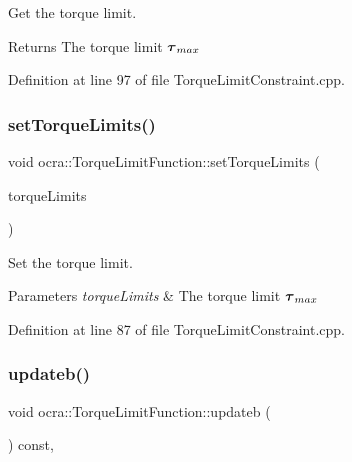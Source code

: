 Get the torque limit.

\begin{DoxyReturn}{Returns}
The torque limit $ \mbox{\boldmath${\tau}$}_{max} $ 
\end{DoxyReturn}


Definition at line 97 of file Torque\+Limit\+Constraint.\+cpp.

\hypertarget{classocra_1_1TorqueLimitFunction_a038250b745913584724401ea719177a5}{}\label{classocra_1_1TorqueLimitFunction_a038250b745913584724401ea719177a5} 
\subsubsection{\texorpdfstring{set\+Torque\+Limits()}{setTorqueLimits()}}
{\footnotesize\ttfamily void ocra\+::\+Torque\+Limit\+Function\+::set\+Torque\+Limits (\begin{DoxyParamCaption}\item[{const Eigen\+::\+Vector\+Xd \&}]{torque\+Limits }\end{DoxyParamCaption})}

Set the torque limit.


\begin{DoxyParams}{Parameters}
{\em torque\+Limits} & The torque limit $ \mbox{\boldmath${\tau}$}_{max} $ \\
\hline
\end{DoxyParams}


Definition at line 87 of file Torque\+Limit\+Constraint.\+cpp.

\hypertarget{classocra_1_1TorqueLimitFunction_a157cb13ffdc53d3a7ed568b59154b0d0}{}\label{classocra_1_1TorqueLimitFunction_a157cb13ffdc53d3a7ed568b59154b0d0} 
\subsubsection{\texorpdfstring{updateb()}{updateb()}}
{\footnotesize\ttfamily void ocra\+::\+Torque\+Limit\+Function\+::updateb (\begin{DoxyParamCaption}{ }\end{DoxyParamCaption}) const\hspace{0.3cm}{\ttfamily [protected]}, {\ttfamily [virtual]}}

